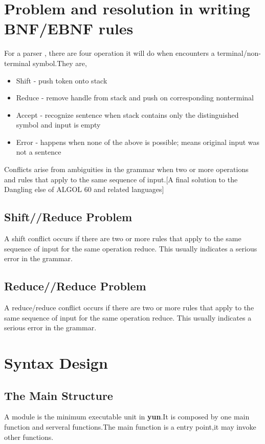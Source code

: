 \section{Problem and resolution in writing BNF/EBNF rules}


For a parser , there are four operation it will do when encounters a terminal/non-terminal symbol.They are,
\begin{itemize}
\item Shift - push token onto stack
\item Reduce - remove handle from stack and push on corresponding nonterminal
\item Accept - recognize sentence when stack contains only the distinguished symbol and input is empty
\item Error - happens when none of the above is possible; means original input was not a sentence
\end{itemize}

Conflicts arise from ambiguities in the grammar when two or more operations and rules that apply to the same sequence of input.[A final solution to the Dangling else of ALGOL 60 and related languages]
\subsection{Shift//Reduce Problem}
A shift conflict occurs if there are two or more rules that
apply to the same sequence of input for the same operation reduce.  This usually indicates a serious
error in the grammar.

\subsection{Reduce//Reduce Problem}
A reduce/reduce conflict occurs if there are two or more rules that
apply to the same sequence of input for the same operation reduce.  This usually indicates a serious
error in the grammar.


\section{Syntax Design}

\subsection{The Main Structure}
A module is the minimum executable unit in \textbf{yun}.It is composed by one main function and serveral functions.The main function is a entry point,it may invoke other functions.

